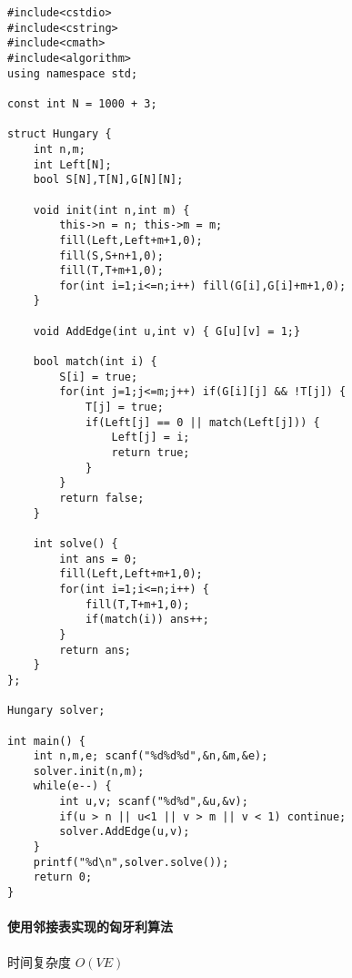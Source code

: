 \documentclass[UTF8]{ctexart}
\begin{document}
\begin{framed}
\begin{lstlisting}
#include<cstdio>
#include<cstring>
#include<cmath>
#include<algorithm>
using namespace std;

const int N = 1000 + 3;

struct Hungary {
    int n,m;
    int Left[N];
    bool S[N],T[N],G[N][N];
    
    void init(int n,int m) {
        this->n = n; this->m = m;
        fill(Left,Left+m+1,0);
        fill(S,S+n+1,0);
        fill(T,T+m+1,0);
        for(int i=1;i<=n;i++) fill(G[i],G[i]+m+1,0);
    }
    
    void AddEdge(int u,int v) { G[u][v] = 1;}
    
    bool match(int i) {
        S[i] = true;
        for(int j=1;j<=m;j++) if(G[i][j] && !T[j]) {
            T[j] = true;
            if(Left[j] == 0 || match(Left[j])) {
                Left[j] = i;
                return true;
            }
        }
        return false;
    }
    
    int solve() {
        int ans = 0;
        fill(Left,Left+m+1,0);
        for(int i=1;i<=n;i++) {
            fill(T,T+m+1,0);
            if(match(i)) ans++;
        }
        return ans;
    }
};

Hungary solver;

int main() {
    int n,m,e; scanf("%d%d%d",&n,&m,&e);
    solver.init(n,m);
    while(e--) {
        int u,v; scanf("%d%d",&u,&v);
        if(u > n || u<1 || v > m || v < 1) continue;
        solver.AddEdge(u,v);
    }
    printf("%d\n",solver.solve());
    return 0;
}
\end{lstlisting}
\end{framed}

\paragraph{使用邻接表实现的匈牙利算法}
时间复杂度 $O(VE)$
\end{document}
